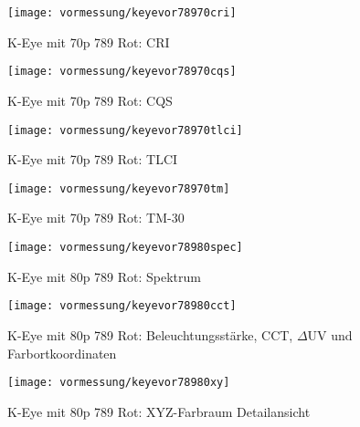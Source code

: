 \documentclass[pagesize,paper=A4,fontsize=12pt,utf8,numbers=noenddot,bibliography=totoc,listof=totoc,DIV=11,BCOR=1mm]{scrreprt}
\begin{document}
\begin{figure}[htp]     %
\centering
\texttt{[image: vormessung/keyevor78970cri]} 
\caption {K-Eye mit 70p 789 Rot: CRI} 
\end{figure}

\begin{figure}[htp]     %
\centering
\texttt{[image: vormessung/keyevor78970cqs]} 
\caption {K-Eye mit 70p 789 Rot: CQS} 
\end{figure}

\begin{figure}[htp]     %
\centering
\texttt{[image: vormessung/keyevor78970tlci]} 
\caption {K-Eye mit 70p 789 Rot: TLCI} 
\end{figure}

\begin{figure}[htp]     %
\centering
\texttt{[image: vormessung/keyevor78970tm]} 
\caption {K-Eye mit 70p 789 Rot: TM-30} 
\end{figure}




\begin{figure}[htp]     %
\centering
\texttt{[image: vormessung/keyevor78980spec]} 
\caption {K-Eye mit 80p 789 Rot: Spektrum} 
\end{figure}

\begin{figure}[htp]     %
\centering
\texttt{[image: vormessung/keyevor78980cct]} 
\caption {K-Eye mit 80p 789 Rot: Beleuchtungsstärke, CCT, $\Delta$UV und Farbortkoordinaten} 
\end{figure}

\begin{figure}[htp]     %
\centering
\texttt{[image: vormessung/keyevor78980xy]} 
\caption {K-Eye mit 80p 789 Rot: XYZ-Farbraum Detailansicht} 
\end{figure}
\end{document}
